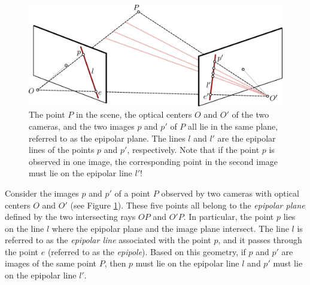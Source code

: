 \begin{figure}[ht]
  \begin{center}
	\includegraphics[width=.8\textwidth]{tex/figs/ch10_figs/stereo.png}
  \end{center}
  \caption{The point $P$ in the scene, the optical centers $O$ and $O'$ of the two cameras, and the two images $p$ and $p'$ of $P$ all lie in the same plane, referred to as the epipolar plane. The lines $l$ and $l'$ are the epipolar lines of the points $p$ and $p'$, respectively. Note that if the point $p$ is observed in one image, the corresponding point in the second image must lie on the epipolar line $l'$!}
  \label{fig:epi}
\end{figure}

Consider the images $p$ and $p'$ of a point $P$ observed by two cameras with optical centers $O$ and $O'$ (see Figure \ref{fig:epi}). These five points all belong to the \textit{epipolar plane} defined by the two intersecting rays $OP$ and $O'P$. 
In particular, the point $p$ lies on the line $l$ where the epipolar plane and the image plane intersect. The line $l$ is referred to as the \textit{epipolar line} associated with the point $p$, and it passes through the point $e$ (referred to as the \textit{epipole}).
Based on this geometry, if $p$ and $p'$ are images of the same point $P$, then $p$ must lie on the epipolar line $l$ and $p'$ must lie on the epipolar line $l'$. 

